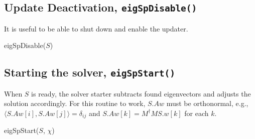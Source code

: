 \documentclass[oneside,openright]{report}
\begin{document}
\subsection{Update Deactivation, \texttt{eigSpDisable()}}
It is useful to be able to shut down and enable the updater.
\begin{function}
\DontPrintSemicolon
{}
\caption{eigSpDisable($S$)}
\end{function}

\subsection{Starting the solver, \texttt{eigSpStart()}}
When $S$ is ready, the solver starter subtracts found eigenvectors and adjusts
the solution accordingly. For this routine to work, $S.Aw$ must be orthonormal, e.g.,
$\langle S.Aw[i], S.Aw[j]\rangle=\delta_{ij}$ and
$S.Aw[k]=M^\dagger M S.w[k]$ for each $k$.
\begin{function}
\DontPrintSemicolon
{}
\caption{eigSpStart($S$, $\chi$)}
\end{function}
\end{document}
